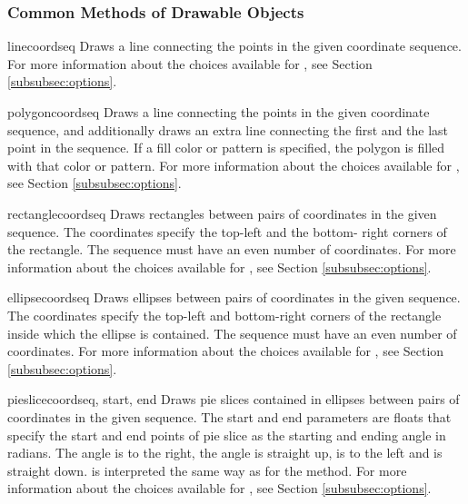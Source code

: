\subsubsection{Common Methods of Drawable Objects}
\label{subsubsec:common}
\begin{methoddesc}{line}{coordseq}
Draws a line connecting the points in the given coordinate sequence. For 
more information about the choices available for , 
see Section \ref{subsubsec:options}.
\end{methoddesc}

\begin{methoddesc}{polygon}{coordseq}
Draws a line connecting the points in the given coordinate sequence, and 
additionally draws an extra line connecting the first and the last point in 
the sequence. If a fill color or pattern is specified, the polygon is filled 
with that color or pattern. For more information about the choices available 
for , see Section \ref{subsubsec:options}.
\end{methoddesc}

\begin{methoddesc}{rectangle}{coordseq}
Draws rectangles between pairs of coordinates in the given sequence. The 
coordinates specify the top-left and the bottom- right corners of the 
rectangle. The sequence must have an even number of coordinates. For more 
information about the choices available for , see 
Section \ref{subsubsec:options}.
\end{methoddesc}

\begin{methoddesc}{ellipse}{coordseq}
Draws ellipses between pairs of coordinates in the given sequence. The
coordinates specify the top-left and bottom-right corners of the
rectangle inside which the ellipse is contained.  The sequence must
have an even number of coordinates. 
For more information about the choices available for , see 
Section \ref{subsubsec:options}.
\end{methoddesc}

\begin{methoddesc}{pieslice}{coordseq, start, end}
Draws pie slices contained in ellipses between pairs of coordinates in
the given sequence. The start and end parameters are floats that
specify the start and end points of pie slice as the starting and
ending angle in radians. The angle  is to the right, the angle
 is straight up,  is to the left and
is straight down.  is interpreted the same way as for
the  method.
For more 
information about the choices available for , see 
Section \ref{subsubsec:options}.
\end{methoddesc}

